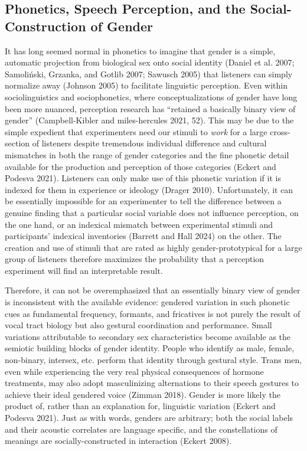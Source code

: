 \documentclass[
  letterpaper,
  DIV=11,
  numbers=noendperiod]{scrartcl}
\begin{document}
\subsection{Phonetics, Speech Perception, and the Social-Construction of
Gender}\label{sec-gender}

It has long seemed normal in phonetics to imagine that gender is a
simple, automatic projection from biological sex onto social identity
(Daniel et al. 2007; Samoliński, Grzanka, and Gotlib 2007; Sawusch 2005)
that listeners can simply normalize away (Johnson 2005) to facilitate
linguistic perception. Even within sociolinguistics and sociophonetics,
where conceptualizations of gender have long been more nuanced,
perception research has ``retained a basically binary view of gender''
(Campbell-Kibler and miles-hercules 2021, 52). This may be due to the
simple expedient that experimenters need our stimuli to \emph{work} for
a large cross-section of listeners despite tremendous individual
difference and cultural mismatches in both the range of gender
categories and the fine phonetic detail available for the production and
perception of those categories (Eckert and Podesva 2021). Listeners can
only make use of this phonetic variation if it is indexed for them in
experience or ideology (Drager 2010). Unfortunately, it can be
essentially impossible for an experimenter to tell the difference
between a genuine finding that a particular social variable does not
influence perception, on the one hand, or an indexical mismatch between
experimental stimuli and participants' indexical inventories (Barrett
and Hall 2024) on the other. The creation and use of stimuli that are
rated as highly gender-prototypical for a large group of listeners
therefore maximizes the probability that a perception experiment will
find an interpretable result.

Therefore, it can not be overemphasized that an essentially binary view
of gender is inconsistent with the available evidence: gendered
variation in such phonetic cues as fundamental frequency, formants, and
fricatives is not purely the result of vocal tract biology but also
gestural coordination and performance. Small variations attributable to
secondary sex characteristics become available as the semiotic building
blocks of gender identity. People who identify as male, female,
non-binary, intersex, etc. perform that identity through gestural style.
Trans men, even while experiencing the very real physical consequences
of hormone treatments, may also adopt masculinizing alternations to
their speech gestures to achieve their ideal gendered voice (Zimman
2018). Gender is more likely the product of, rather than an explanation
for, linguistic variation (Eckert and Podesva 2021). Just as with words,
genders are arbitrary; both the social labels and their acoustic
correlates are language specific, and the constellations of meanings are
socially-constructed in interaction (Eckert 2008).
\end{document}
